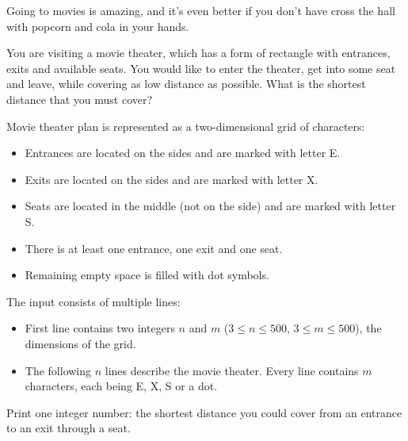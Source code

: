 \problemname{\problemyamlname}


\newcommand{\minn}{3}
\newcommand{\maxn}{500}
\newcommand{\minm}{3}
\newcommand{\maxm}{500}

Going to movies is amazing, and it's even better if you don't have cross the hall with popcorn and cola in your hands.

You are visiting a movie theater, which has a form of rectangle with entrances, exits and available seats. You would like to enter the theater, get into some seat and leave, while covering as low distance as possible. What is the shortest distance that you must cover?

Movie theater plan is represented as a two-dimensional grid of characters:
\begin{itemize}
    \item Entrances are located on the sides and are marked with letter E.
    \item Exits are located on the sides and are marked with letter X.
    \item Seats are located in the middle (not on the side) and are marked with letter S.
    \item There is at least one entrance, one exit and one seat.
    \item Remaining empty space is filled with dot symbols.
\end{itemize}

\begin{Input}
    The input consists of multiple lines:
    \begin{itemize}
        \item First line contains two integers $n$ and $m$ ($\minn \leq n \leq \maxn$, $\minm \leq m \leq \maxm$), the dimensions of the grid.
        \item The following $n$ lines describe the movie theater. Every line contains $m$ characters, each being E, X, S or a dot.
     \end{itemize}
\end{Input}

\begin{Output}
    Print one integer number: the shortest distance you could cover from an entrance to an exit through a seat.
\end{Output}
